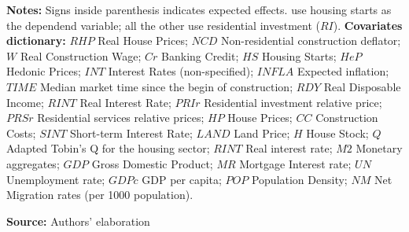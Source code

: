 \begin{table}[htb]
\begin{threeparttable}
    \footnotesize{\textbf{Notes:} Signs inside parenthesis indicates expected effects. \textcite{topel_1988_Housing} use housing starts as the dependend variable; all the other use residential investment ($RI$). \textbf{Covariates dictionary:} $RHP$ Real House Prices; $NCD$ Non-residential construction deflator; $W$ Real Construction Wage; $Cr$ Banking Credit; $HS$ Housing Starts; $HeP$ Hedonic Prices; $INT$ Interest Rates (non-specified); $INFLA$ Expected inflation; $TIME$ Median market time since the begin of construction; $RDY$ Real Disposable Income; $RINT$ Real Interest Rate; $PRIr$ Residential investment relative price; $PRSr$ Residential services relative prices; $HP$ House Prices; $CC$ Construction Costs; $SINT$ Short-term Interest Rate; $LAND$ Land Price; $H$ House Stock; $Q$ Adapted Tobin's Q for the housing sector; $RINT$ Real interest rate; $M2$ Monetary aggregates; $GDP$ Gross Domestic Product; $MR$ Mortgage Interest rate; $UN$ Unemployment rate; $GDPc$ GDP per capita; $POP$ Population Density; $NM$ Net Migration rates (per 1000 population).}
  \end{threeparttable}
    \caption*{\textbf{Source:} Authors' elaboration}
\end{table}
